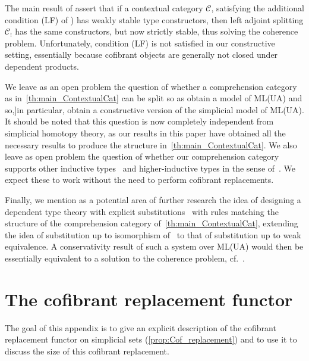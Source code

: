 \documentclass[reqno,10pt,a4paper,oneside,draft]{amsart}
\begin{document}
\begin{remark}
The main result of \cite{LumsdaineP:locuoc} assert that if a contextual category $\mathcal{C}$, satisfying 
the additional condition  (LF) of \cite[Definition 3.1.3]{LumsdaineP:locuoc}) has weakly stable type constructors, then left adjoint splitting $\mathcal{C}_!$ has the same constructors, but now strictly stable,
thus solving the coherence problem. Unfortunately, condition (LF) is not satisfied in our constructive
setting, essentially because cofibrant objects are generally not closed under dependent products.  
\end{remark}

We leave as an open problem the question of whether a comprehension category as in~\cref{th:main_ContextualCat} can be split so as obtain a model of ML(UA) and so,]in particular,
obtain a constructive version of the simplicial model of ML(UA). It should be noted that this question
is now completely independent from simplicial homotopy theory, as our results in this paper have 
obtained all the necessary results to produce the structure in~\cref{th:main_ContextualCat}. 
We also leave as open problem the question of whether our comprehension category supports
other inductive types~\cite{vandenberg_moerdijk_2015} and higher-inductive types in the sense of~\cite{hottbook}. 
We expect these to work without the need to perform cofibrant replacements. 


Finally, we mention as a potential area of further research the idea of designing a dependent type
theory with explicit substitutions~\cite{AbadiM:exps} with rules matching the structure of the comprehension category of~\cref{th:main_ContextualCat}, extending the idea of 
substitution up to isomorphism of~\cite{CurienP:subi} to that of substitution up to weak equivalence. 
A conservativity result of such a system over ML(UA)
would then be essentially equivalent to a solution to the coherence problem, {cf.}~\cite{CurienPL:revcit}.


\appendix

\section{The cofibrant replacement functor}
\label{sec:appendix}


The goal of this appendix is to give an explicit description of the cofibrant replacement functor on simplicial sets (\cref{prop:Cof_replacement}) and to use it to discuss the size of this cofibrant replacement.
\end{document}
